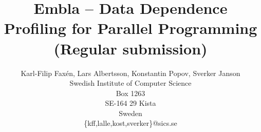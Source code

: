 \documentclass[11pt]{article}
\begin{document}
\begin{titlepage}

\title{Embla -- Data Dependence Profiling for Parallel Programming \\
  \Large (Regular submission)}
\author{Karl-Filip Fax\'en, Lars Albertsson, Konstantin Popov, Sverker Janson\\
       Swedish Institute of Computer Science\\
       Box 1263\\
       SE-164 29 Kista\\
       Sweden\\
       \{kff,lalle,kost,sverker\}@sics.se}
\date{}
\maketitle
\thispagestyle{empty}


\end{titlepage}




%






\end{document}
